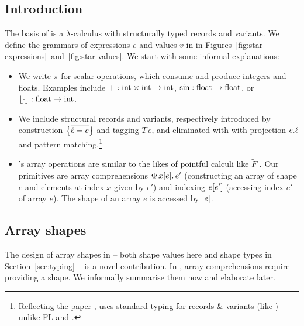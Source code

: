 \subsection{Introduction}
\label{subsec:star-intro}

The basis of \starr{} is a $\lambda$-calculus with structurally typed records and variants. We define the grammars of expressions $e$ and values $v$ in \starr{} in Figures~\ref{fig:star-expressions}~and~\ref{fig:star-values}.
We start with some informal explanations:

\begin{itemize}
    \item We write $\pi$ for scalar operations, which consume and produce integers and floats. Examples include $+: \mathrm{int} \times \mathrm{int} \to \mathrm{int}$, $\mathrm{sin} : \mathrm{float} \to \mathrm{float}$, or $\lfloor \cdot \rfloor : \mathrm{float} \to \mathrm{int}$.
    \item We include structural records and variants, respectively introduced by construction $\srecordval{\overline{\ell = e}}$ and tagging $T\,e$, and eliminated with with projection ${e}{.}{\ell}$ and pattern matching.\footnote{Reflecting the paper \cite{star}, \starr{} uses standard typing for records \& variants (like \textcite{tapl}) -- unlike FL and \fabric{}.}
    \item \starr{}'s array operations are similar to the likes of pointful calculi like $\tilde F$ \cite{f-smooth}. Our primitives are array comprehensions $\sbuild{x}{e}{e'}$ (constructing an array of shape $e$ and elements at index $x$ given by $e'$) and indexing $\sindex{e}{e'}$ (accessing index $e'$ of array $e$).
    The shape of an array $e$ is accessed by $\sshape{e}$.
\end{itemize}

\subsection{Array shapes}
\label{subsec:array-shapes}

The design of array shapes in \starr{} -- both shape values here and shape types in Section~\ref{sec:typing} -- is a novel contribution.
In \starr{}, array comprehensions require providing a shape.
We informally summarise them now and elaborate later. 

